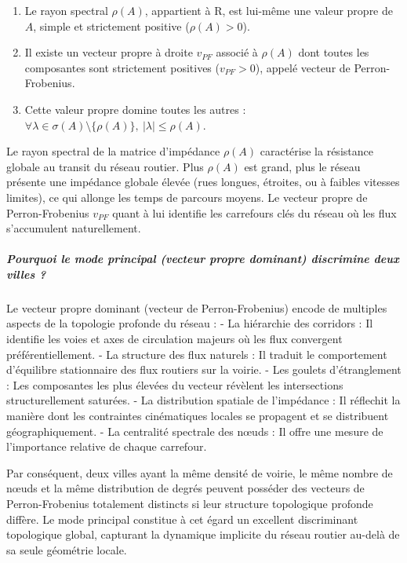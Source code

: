 \documentclass[10pt, a4paper]{article}
\providecommand{\tightlist}{}
\begin{document}
\begin{enumerate}
\def\labelenumi{\arabic{enumi}.}
\tightlist
\item
  Le rayon spectral \(\rho(A)\), appartient à R, est lui-même une valeur
  propre de \(A\), simple et strictement positive (\(\rho(A) > 0\)).
\item
  Il existe un vecteur propre à droite \(v_{PF}\) associé à \(\rho(A)\)
  dont toutes les composantes sont strictement positives
  (\(v_{PF} > 0\)), appelé vecteur de Perron-Frobenius.
\item
  Cette valeur propre domine toutes les autres :
  \(\forall \lambda \in \sigma(A) \setminus \{\rho(A)\}, \ |\lambda| \le \rho(A)\).
\end{enumerate}

Le rayon spectral de la matrice d'impédance \(\rho(A)\) caractérise la
résistance globale au transit du réseau routier. Plus \(\rho(A)\) est
grand, plus le réseau présente une impédance globale élevée (rues
longues, étroites, ou à faibles vitesses limites), ce qui allonge les
temps de parcours moyens. Le vecteur propre de Perron-Frobenius
\(v_{PF}\) quant à lui identifie les carrefours clés du réseau où les
flux s'accumulent naturellement.

\subparagraph{Pourquoi le mode principal (vecteur propre dominant)
discrimine deux villes
?}\label{pourquoi-le-mode-principal-vecteur-propre-dominant-discrimine-deux-villes}

Le vecteur propre dominant (vecteur de Perron-Frobenius) encode de
multiples aspects de la topologie profonde du réseau : - La hiérarchie
des corridors : Il identifie les voies et axes de circulation majeurs où
les flux convergent préférentiellement. - La structure des flux naturels
: Il traduit le comportement d'équilibre stationnaire des flux routiers
sur la voirie. - Les goulets d'étranglement : Les composantes les plus
élevées du vecteur révèlent les intersections structurellement saturées.
- La distribution spatiale de l'impédance : Il réflechit la manière dont
les contraintes cinématiques locales se propagent et se distribuent
géographiquement. - La centralité spectrale des nœuds : Il offre une
mesure de l'importance relative de chaque carrefour.

Par conséquent, deux villes ayant la même densité de voirie, le même
nombre de nœuds et la même distribution de degrés peuvent posséder des
vecteurs de Perron-Frobenius totalement distincts si leur structure
topologique profonde diffère. Le mode principal constitue à cet égard un
excellent discriminant topologique global, capturant la dynamique
implicite du réseau routier au-delà de sa seule géométrie locale.
\end{document}
